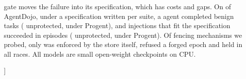 \begin{@twocolumnfalse}
\begin{center}
\begin{minipage}{.96\textwidth}
gate moves the failure into its specification, which has costs and gaps. On \vsixEEightTasks{} of AgentDojo, under a
specification written per suite, a \vsixEEightCkpt{} agent completed \vsixStrictUtility{} benign tasks
(\vsixUnprotectedUtility{} unprotected, \vsixProgentUtility{} under Progent), and injections that fit the
specification succeeded in \vsixStrictInside{} episodes (\vsixUnprotectedInside{} unprotected, \vsixProgentInside{}
under Progent). Of \vsixFenceMechanisms{} fencing mechanisms we probed, only \vsixFenceAllThree{} was enforced by the
store itself, refused a forged epoch and held in all \vsixFenceAllThreeRaces{} races. All models are small open-weight
checkpoints on CPU.
\end{minipage}\end{center}
\vspace{3pt}

\vspace{4pt}
\end{@twocolumnfalse}]
\makeatother
